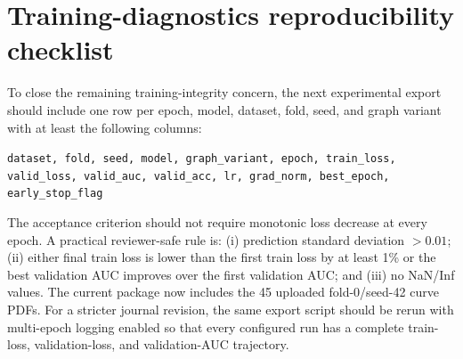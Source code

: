 \documentclass[11pt,a4paper]{article}
\begin{document}
\section{Training-diagnostics reproducibility checklist}
\label{app:training-repro}
To close the remaining training-integrity concern, the next experimental export should include one row per epoch, model, dataset, fold, seed, and graph variant with at least the following columns:
\begin{center}
\small\texttt{dataset, fold, seed, model, graph\_variant, epoch, train\_loss, valid\_loss, valid\_auc, valid\_acc, lr, grad\_norm, best\_epoch, early\_stop\_flag}
\end{center}
The acceptance criterion should not require monotonic loss decrease at every epoch. A practical reviewer-safe rule is: (i) prediction standard deviation $>0.01$; (ii) either final train loss is lower than the first train loss by at least 1\% or the best validation AUC improves over the first validation AUC; and (iii) no NaN/Inf values. The current package now includes the 45 uploaded fold-0/seed-42 curve PDFs. For a stricter journal revision, the same export script should be rerun with multi-epoch logging enabled so that every configured run has a complete train-loss, validation-loss, and validation-AUC trajectory.
\end{document}
